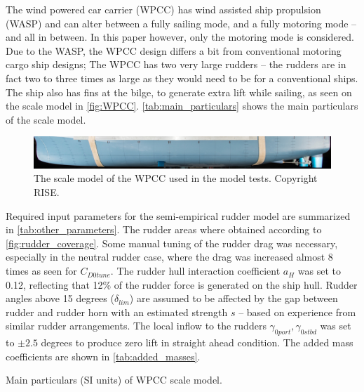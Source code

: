 The wind powered car carrier (WPCC) has wind assisted ship propulsion (WASP) and can alter between a fully sailing mode, and a fully motoring mode -- and all in between. 
In this paper however, only the motoring mode is considered. Due to the WASP, the WPCC design differs a bit from conventional motoring cargo ship designs; The WPCC has two very large rudders -- the rudders are in fact two to three times as large as they would need to be for a conventional ships. The ship also has fins at the bilge, to generate extra lift while sailing, as seen on the scale model in \autoref{fig:WPCC}. 
\autoref{tab:main_particulars} shows the main particulars of the scale model. 
\begin{figure}[h]
    \centering
    \includegraphics[width=\columnwidth]{figures/5m2.jpg}
    \caption{The scale model of the WPCC used in the model tests. Copyright RISE.}
    \label{fig:WPCC}
\end{figure}

Required input parameters for the semi-empirical rudder model are summarized in \autoref{tab:other_parameters}.
The rudder areas where obtained according to \autoref{fig:rudder_coverage}.   
Some manual tuning of the rudder drag was necessary, especially in the neutral rudder case, where the drag was increased almost 8 times as seen for $C_{D0tune}$. The rudder hull interaction coefficient $a_H$ was set to 0.12, reflecting that 12\% of the rudder force is generated on the ship hull.
Rudder angles above 15 degrees ($\delta_{lim}$) are assumed to be affected by the gap between rudder and rudder horn with an estimated strength $s$ -- based on experience from similar rudder arrangements.
The local inflow to the rudders $\gamma_{0port},\gamma_{0stbd}$ was set to $\pm 2.5$ degrees to produce zero lift in straight ahead condition.
The added mass coefficients are shown in \autoref{tab:added_masses}.
\begin{table}[h]
    \centering
    \caption{Main particulars (SI units) of WPCC scale model.}
    \label{tab:main_particulars}
\end{table}